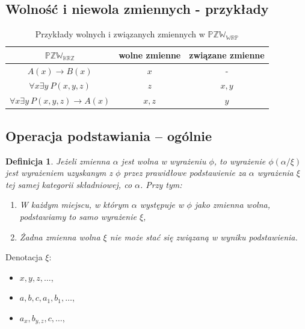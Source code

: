 \documentclass[12pt]{article}
\newtheorem{definicja}{Definicja}
\newcommand {\PZWKRZ} {\ensuremath{\mathbb{PZW_{KRZ}}}}
\newcommand {\PZWWRP} {\ensuremath{\mathbb{PZW_{WRP}}}}
\begin{document}
\subsection{Wolność i niewola zmiennych - przykłady}
\begin{table}[p]
\caption{Przykłady wolnych i związanych zmiennych  w \PZWWRP}
\begin{center}
\begin{tabular}{|c|c|c|}
\hline
\textbf{\PZWKRZ} & \textbf{wolne zmienne} & \textbf{związane zmienne}\\
\hline
$A(x) \to B(x)$& $x$ & -\\
\hline
$\forall x \exists y~ P(x,y,z)$ & $z$ & $x, y$\\
\hline
$\forall x \exists y~ P(x,y,z)\to A(x)$ & $x,z$ & $y$ \\
\hline
\end{tabular}
\end{center}
\label{Przyklady wolnosci}
\end{table}
%

\subsection{Operacja podstawiania -- ogólnie}
%
\begin{definicja}
Jeżeli zmienna $\alpha$ jest wolna w wyrażeniu $\phi$, to wyrażenie $\phi(\alpha / \xi)$ jest wyrażeniem uzyskanym z $\phi$ przez prawidłowe podstawienie za $\alpha$ wyrażenia $\xi$ tej samej kategorii składniowej, co $\alpha$. Przy tym:
%
\begin{enumerate}
\item W każdym miejscu, w którym $\alpha$ występuje w $\phi$ jako zmienna wolna, podstawiamy to samo wyrażenie $\xi$,
%
\item Żadna zmienna wolna $\xi$ nie może stać się związaną w wyniku podstawienia.
\end{enumerate}
\end{definicja}
%
Denotacja $\xi$:
\begin{itemize}
\item $x, y, z, \dots$,
\item $a, b, c, a_{1}, b_{1}, \dots$,
\item $a_x, b_{y,z}, c, \dots$,
\end{itemize}
%
\end{document}
